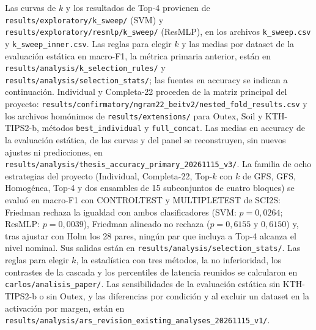 \documentclass[a4paper,fleqn]{cas-sc}
\begin{document}
Las curvas de $k$ y los resultados de Top-4 provienen de \nolinkurl{results/exploratory/k_sweep/} (SVM) y \nolinkurl{results/exploratory/resmlp/k_sweep/} (ResMLP), en los archivos \nolinkurl{k_sweep.csv} y \nolinkurl{k_sweep_inner.csv}. Las reglas para elegir $k$ y las medias por dataset de la evaluación estática en macro-F1, la métrica primaria anterior, están en \nolinkurl{results/analysis/k_selection_rules/} y \nolinkurl{results/analysis/selection_stats/}; las fuentes en accuracy se indican a continuación. Individual y Completa-22 proceden de la matriz principal del proyecto: \nolinkurl{results/confirmatory/ngram22_beitv2/nested_fold_results.csv} y los archivos homónimos de \nolinkurl{results/extensions/} para Outex, Soil y KTH-TIPS2-b, métodos \texttt{best\_individual} y \texttt{full\_concat}. Las medias en accuracy de la evaluación estática, de las curvas y del panel se reconstruyen, sin nuevos ajustes ni predicciones, en \nolinkurl{results/analysis/thesis_accuracy_primary_20261115_v3/}. La familia de ocho estrategias del proyecto (Individual, Completa-22, Top-$k$ con $k$ de GFS, GFS, Homogénea, Top-4 y dos ensambles de 15 subconjuntos de cuatro bloques) se evaluó en macro-F1 con CONTROLTEST y MULTIPLETEST de SCI2S: Friedman rechaza la igualdad con ambos clasificadores (SVM: $p=0{,}0264$; ResMLP: $p=0{,}0039$), Friedman alineado no rechaza ($p=0{,}6155$ y $0{,}6150$) y, tras ajustar con Holm los 28 pares, ningún par que incluya a Top-4 alcanza el nivel nominal. Sus salidas están en \nolinkurl{results/analysis/selection_stats/}. Las reglas para elegir $k$, la estadística con tres métodos, la no inferioridad, los contrastes de la cascada y los percentiles de latencia reunidos se calcularon en \nolinkurl{carlos/analisis_paper/}. Las sensibilidades de la evaluación estática sin KTH-TIPS2-b o sin Outex, y las diferencias por condición y al excluir un dataset en la activación por margen, están en \nolinkurl{results/analysis/ars_revision_existing_analyses_20261115_v1/}.
\end{document}
